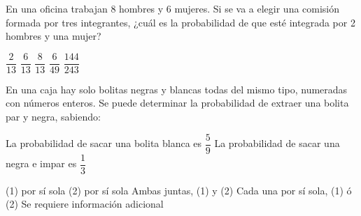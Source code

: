 \documentclass[sin nombre]{srs2}
\begin{document}
\begin{preguntas}
\pregunta En una oficina trabajan 8 hombres y 6 mujeres. Si se va a elegir una comisión formada por tres integrantes, ¿cuál es la probabilidad de que esté integrada por 2 hombres y una mujer?
\begin{alternativas}
\alternativa $\dfrac{2}{13}$
\alternativa $\dfrac{6}{13}$
\alternativa $\dfrac{8}{13}$
\alternativa $\dfrac{6}{49}$
\alternativa $\dfrac{144}{243}$
\end{alternativas}

\pregunta En una caja hay solo bolitas negras y blancas todas del mismo tipo, numeradas con números enteros. Se puede determinar la probabilidad de extraer una bolita par y negra, sabiendo:
\begin{opciones*}
\opcion La probabilidad de sacar una bolita blanca es $\dfrac{5}{9}$
\opcion La probabilidad de sacar una negra e impar es $\dfrac{1}{3}$
\end{opciones*}
\begin{alternativas}
\alternativa (1) por sí sola
\alternativa (2) por sí sola
\alternativa Ambas juntas, (1) y (2)
\alternativa Cada una por sí sola, (1) ó (2)
\alternativa Se requiere información adicional
\end{alternativas}

\end{preguntas}
\end{document}
